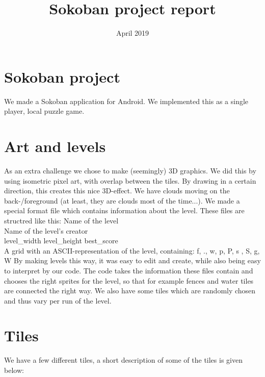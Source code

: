 \documentclass{article}
\title{Sokoban project report}
\date{April 2019}
\begin{document}
\maketitle

\section*{Sokoban project}
We made a Sokoban application for Android. We implemented this as a single player, local puzzle game.

\section*{Art and levels}
As an extra challenge we chose to make (seemingly) 3D graphics. We did this by using isometric pixel art, with overlap between the tiles. By drawing in a certain direction, this creates this nice 3D-effect.
We have clouds moving on the back-/foreground (at least, they are clouds most of the time...). We made a special format file which contains information about the level. These files are structred like this:
\bigbreak\noindent
Name of the level\\
Name of the level's creator\\
level\_width level\_height best\_score\\
A grid with an ASCII-representation of the level, containing: f, ., w, p, P, s , S, g, W
\bigbreak\noindent
By making levels this way, it was easy to edit and create, while also being easy to interpret by our code. The code takes the information these files contain and chooses the right sprites for the level, so that for example fences and water tiles are connected the right way. We also have some tiles which are randomly chosen and thus vary per run of the level.

\section*{Tiles}
We have a few different tiles, a short description of some of the tiles is given below:
\end{document}
